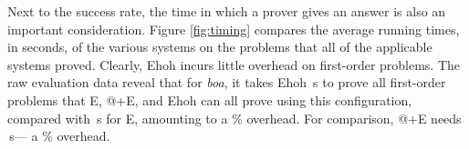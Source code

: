 \begin{rep}
Next to the success rate, the time in which a prover gives an
answer is also an important consideration. Figure \ref{fig:timing} compares
the average running times, in seconds, of the various systems on the problems
that all of the applicable systems proved.
Clearly, Ehoh incurs little overhead on first-order problems. The raw
evaluation data reveal that for \emph{boa}, it takes Ehoh \,s
to prove all first-order problems that E, @+E, and Ehoh can all prove using this
configuration, compared with \,s for E, amounting to a
\% overhead. For comparison, @+E needs \,s---%
a \% overhead.


\end{rep}
